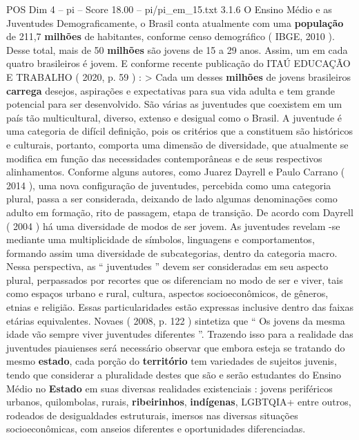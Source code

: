 \begin{textsample}{POS Dim 4 – pi – Score 18.00 – pi/pi\_em\_15.txt}  \label{ex:f4_pos_121}
3.1.6 O Ensino Médio e as Juventudes Demograficamente, o Brasil conta atualmente com uma \textbf{população} de 211,7 \textbf{milhões} de habitantes, conforme censo demográfico ( IBGE, 2010 ).
Desse total, mais de 50 \textbf{milhões} são jovens de 15 a 29 anos.
Assim, um em cada quatro brasileiros é jovem.
E conforme recente publicação do ITAÚ EDUCAÇÃO E TRABALHO ( 2020, p. 59 ) : > Cada um desses \textbf{milhões} de jovens brasileiros \textbf{carrega} desejos, aspirações e expectativas para sua vida adulta e tem grande potencial para ser desenvolvido.
São várias as juventudes que coexistem em um país tão multicultural, diverso, extenso e desigual como o Brasil.
A juventude é uma categoria de difícil definição, pois os critérios que a constituem são históricos e culturais, portanto, comporta uma dimensão de diversidade, que atualmente se modifica em função das necessidades contemporâneas e de seus respectivos alinhamentos.
Conforme alguns autores, como Juarez Dayrell e Paulo Carrano ( 2014 ), uma nova configuração de juventudes, percebida como uma categoria plural, passa a ser considerada, deixando de lado algumas denominações como adulto em formação, rito de passagem, etapa de transição.
De acordo com Dayrell ( 2004 ) há uma diversidade de modos de ser jovem.
As juventudes revelam -se mediante uma multiplicidade de símbolos, linguagens e comportamentos, formando assim uma diversidade de subcategorias, dentro da categoria macro.
Nessa perspectiva, as “ juventudes ” devem ser consideradas em seu aspecto plural, perpassados por recortes que os diferenciam no modo de ser e viver, tais como espaços urbano e rural, cultura, aspectos socioeconômicos, de gêneros, etnias e religião.
Essas particularidades estão expressas inclusive dentro das faixas etárias equivalentes.
Novaes ( 2008, p. 122 ) sintetiza que “ Os jovens da mesma idade vão sempre viver juventudes diferentes ”.
Trazendo isso para a realidade das juventudes piauienses será necessário observar que embora esteja se tratando do mesmo \textbf{estado}, cada porção do \textbf{território} tem variedades de sujeitos juvenis, tendo que considerar a pluralidade destes que são e serão estudantes do Ensino Médio no \textbf{Estado} em suas diversas realidades existenciais : jovens periféricos urbanos, quilombolas, rurais, \textbf{ribeirinhos}, \textbf{indígenas}, LGBTQIA+ entre outros, rodeados de desigualdades estruturais, imersos nas diversas situações socioeconômicas, com anseios diferentes e oportunidades diferenciadas.

\end{textsample}
